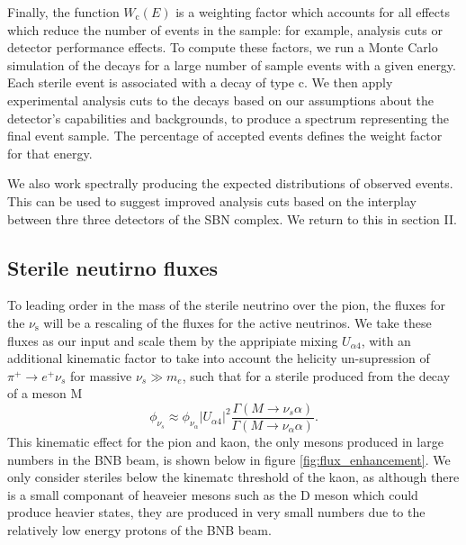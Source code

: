\documentclass[11pt, a4paper]{article}
\begin{document}
%
Finally, the function $W_\text{c}(E)$ is a weighting factor which accounts for
all effects which reduce the number of events in the sample: for example,
analysis cuts or detector performance effects.
%
To compute these factors, we run a Monte Carlo simulation of the decays for a
large number of sample events with a given energy. Each sterile event is
associated with a decay of type $\text{c}$. We then apply experimental analysis
cuts to the decays based on our assumptions about the detector's capabilities
and backgrounds, to produce a spectrum representing the final event sample. The
percentage of accepted events defines the weight factor for that energy.

We also work spectrally producing the expected distributions of observed
events. This can be used to suggest improved analysis cuts based on the
interplay between thre three detectors of the SBN complex. We return to this in
section II.

\subsection{Sterile neutirno fluxes}

To leading order in the mass of the sterile neutrino over the pion, the fluxes
for the $\nu_\text{s}$ will be a rescaling of the fluxes for the active
neutrinos.  We take these fluxes as our input and scale them by the appripiate mixing $U_{\alpha 4}$, with an additional kinematic factor to take into account the helicity un-supression of $\pi^+ \rightarrow e^+\nu_s$ for massive $\nu_s \gg m_e$, such that for a sterile produced from the decay of a meson M
\[
	\phi_{\nu_s} \approx \phi_{\nu_\alpha} \vert U_{\alpha 4}\vert^2 \frac{\Gamma(M \rightarrow \nu_s \alpha)}{\Gamma(M\rightarrow \nu_\alpha \alpha)}.
\]
This kinematic effect for the pion and kaon, the only mesons produced in large numbers in the BNB beam, is shown below in figure \ref{fig:flux_enhancement}. We only consider steriles below the kinematc threshold of the kaon, as although there is a small componant of heaveier mesons such as the D meson which could produce heavier states, they are produced in very small numbers due to the relatively low energy protons of the BNB beam. 
\end{document}
